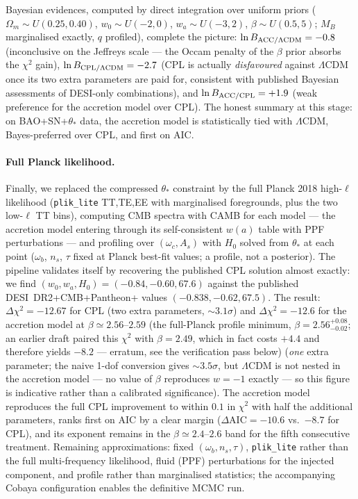 \documentclass[11pt]{article}
\begin{document}
Bayesian evidences, computed by direct integration over uniform priors ($\Omega_m \sim U(0.25,0.40)$, $w_0 \sim U(-2,0)$, $w_a \sim U(-3,2)$, $\beta \sim U(0.5,5)$; $M_B$ marginalised exactly, $q$ profiled), complete the picture: $\ln B_{\rm ACC/\Lambda CDM} = -0.8$ (inconclusive on the Jeffreys scale --- the Occam penalty of the $\beta$ prior absorbs the $\chi^2$ gain), $\ln B_{\rm CPL/\Lambda CDM} = -2.7$ (CPL is actually \emph{disfavoured} against $\Lambda$CDM once its two extra parameters are paid for, consistent with published Bayesian assessments of DESI-only combinations), and $\ln B_{\rm ACC/CPL} = +1.9$ (weak preference for the accretion model over CPL). The honest summary at this stage: on BAO+SN+$\theta_*$ data, the accretion model is statistically tied with $\Lambda$CDM, Bayes-preferred over CPL, and first on AIC.

\paragraph{Full Planck likelihood.} Finally, we replaced the compressed $\theta_*$ constraint by the full Planck 2018 high-$\ell$ likelihood (\texttt{plik\_lite} TT,TE,EE with marginalised foregrounds, plus the two low-$\ell$ TT bins), computing CMB spectra with CAMB for each model --- the accretion model entering through its self-consistent $w(a)$ table with PPF perturbations --- and profiling over $(\omega_c, A_s)$ with $H_0$ solved from $\theta_*$ at each point ($\omega_b$, $n_s$, $\tau$ fixed at Planck best-fit values; a profile, not a posterior). The pipeline validates itself by recovering the published CPL solution almost exactly: we find $(w_0, w_a, H_0) = (-0.84, -0.60, 67.6)$ against the published DESI~DR2+CMB+Pantheon+ values $(-0.838, -0.62, 67.5)$. The result: $\Delta\chi^2 = -12.67$ for CPL (two extra parameters, $\sim 3.1\sigma$) and $\Delta\chi^2 = -12.6$ for the accretion model at $\beta \simeq 2.56$--$2.59$ (the full-Planck profile minimum, $\beta = 2.56^{+0.08}_{-0.02}$; an earlier draft paired this $\chi^2$ with $\beta = 2.49$, which in fact costs $+4.4$ and therefore yields $-8.2$ --- erratum, see the verification pass below) (\emph{one} extra parameter; the naive 1-dof conversion gives $\sim 3.5\sigma$, but $\Lambda$CDM is not nested in the accretion model --- no value of $\beta$ reproduces $w=-1$ exactly --- so this figure is indicative rather than a calibrated significance). The accretion model reproduces the full CPL improvement to within $0.1$ in $\chi^2$ with half the additional parameters, ranks first on AIC by a clear margin ($\Delta\mathrm{AIC} = -10.6$ vs.\ $-8.7$ for CPL), and its exponent remains in the $\beta \simeq 2.4$--$2.6$ band for the fifth consecutive treatment. Remaining approximations: fixed $(\omega_b, n_s, \tau)$, \texttt{plik\_lite} rather than the full multi-frequency likelihood, fluid (PPF) perturbations for the injected component, and profile rather than marginalised statistics; the accompanying Cobaya configuration enables the definitive MCMC run.
\end{document}
